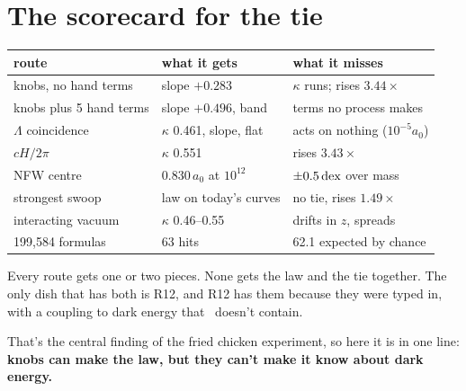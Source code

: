 \section{The scorecard for the tie}



\begin{center}\small
\begin{tabular}{@{}lll@{}}
\toprule
route & what it gets & what it misses\\
\midrule
knobs, no hand terms & slope $+0.283$ & $\kappa$ runs; rises $3.44\times$\\
knobs plus 5 hand terms & slope $+0.496$, band & terms no process makes\\
$\Lambda$ coincidence & $\kappa$ 0.461, slope, flat & acts on nothing ($10^{-5}a_0$)\\
$cH/2\pi$ & $\kappa$ 0.551 & rises $3.43\times$\\
NFW centre & $0.830\,a_0$ at $10^{12}$ & $\pm0.5\,\mathrm{dex}$ over mass\\
strongest swoop & law on today's curves & no tie, rises $1.49\times$\\
interacting vacuum & $\kappa$ 0.46--0.55 & drifts in $z$, spreads\\
199,584 formulas & 63 hits & 62.1 expected by chance\\
\bottomrule
\end{tabular}
\end{center}

Every route gets one or two pieces. None gets the law and the tie together. The only dish that has both is R12, and R12 has them because they were typed in, with a coupling to dark energy that \LCDM\ doesn't contain.

That's the central finding of the fried chicken experiment, so here it is in one line: \textbf{knobs can make the law, but they can't make it know about dark energy.}
